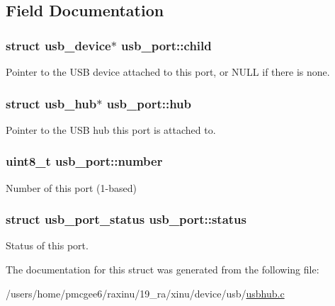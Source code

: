 \subsection{Field Documentation}
\hypertarget{structusb__port_afad6616803945c9ed1fe0cd7b1d8b612}{
\subsubsection[{child}]{\setlength{\rightskip}{0pt plus 5cm}struct usb\-\_\-device$\ast$ usb\-\_\-port\-::child}}\label{structusb__port_afad6616803945c9ed1fe0cd7b1d8b612}
Pointer to the U\-S\-B device attached to this port, or N\-U\-L\-L if there is none. \hypertarget{structusb__port_a32a3b6f74c651364bc843206100f5af8}{
\subsubsection[{hub}]{\setlength{\rightskip}{0pt plus 5cm}struct {\bf usb\-\_\-hub}$\ast$ usb\-\_\-port\-::hub}}\label{structusb__port_a32a3b6f74c651364bc843206100f5af8}
Pointer to the U\-S\-B hub this port is attached to. \hypertarget{structusb__port_ae4ff07e00205ab6051034896b60e211b}{
\subsubsection[{number}]{\setlength{\rightskip}{0pt plus 5cm}uint8\-\_\-t usb\-\_\-port\-::number}}\label{structusb__port_ae4ff07e00205ab6051034896b60e211b}
Number of this port (1-\/based) \hypertarget{structusb__port_a761cbd419f28cb6ee0f1d2668a55e11a}{
\subsubsection[{status}]{\setlength{\rightskip}{0pt plus 5cm}struct usb\-\_\-port\-\_\-status usb\-\_\-port\-::status}}\label{structusb__port_a761cbd419f28cb6ee0f1d2668a55e11a}
Status of this port. 

The documentation for this struct was generated from the following file\-:\begin{DoxyCompactItemize}
\item 
/users/home/pmcgee6/raxinu/19\-\_\-ra/xinu/device/usb/\hyperlink{usbhub_8c}{usbhub.\-c}\end{DoxyCompactItemize}
